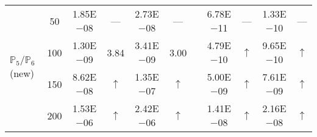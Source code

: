 \begin{table}[H]
{\begin{tabular}{@{}l c c c c c c c c c c@{}}
\midrule
\multirow{4}{*}{$\mathbb{P}_{5}/\mathbb{P}_{6}$ (new)}
 & 50 & 1.85E$-$08 & ---  & 2.73E$-$08 & --- &  & 6.78E$-$11 & --- & 1.33E$-$10 & ---\\
 & 100 & 1.30E$-$09 & 3.84  & 3.41E$-$09 & 3.00 &  & 4.79E$-$10 & $\uparrow$ & 9.65E$-$10 & $\uparrow$\\
 & 150 & 8.62E$-$08 & $\uparrow$  & 1.35E$-$07 & $\uparrow$ &  & 5.00E$-$09 & $\uparrow$ & 7.61E$-$09 & $\uparrow$\\
 & 200 & 1.53E$-$06 & $\uparrow$  & 2.42E$-$06 & $\uparrow$ &  & 1.41E$-$08 & $\uparrow$ & 2.16E$-$08 & $\uparrow$\\
\bottomrule
\end{tabular}}
\label{none}
\end{table}
